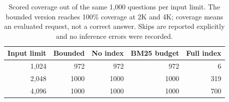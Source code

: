 \begin{table}[htbp]
\centering
\small
\setlength{\tabcolsep}{4pt}
\caption{Scored coverage out of the same 1,000 questions per input limit. The bounded version reaches 100\% coverage at 2K and 4K; coverage means an evaluated request, not a correct answer. Skips are reported explicitly and no inference errors were recorded.}
\label{tab:coverage}
\begin{tabular}{rrrrr}
\toprule
Input limit & Bounded & No index & BM25 budget & Full index \\
\midrule
1,024 & 972 & 972 & 972 & 6 \\
2,048 & 1000 & 1000 & 1000 & 319 \\
4,096 & 1000 & 1000 & 1000 & 700 \\
\bottomrule
\end{tabular}
\end{table}
